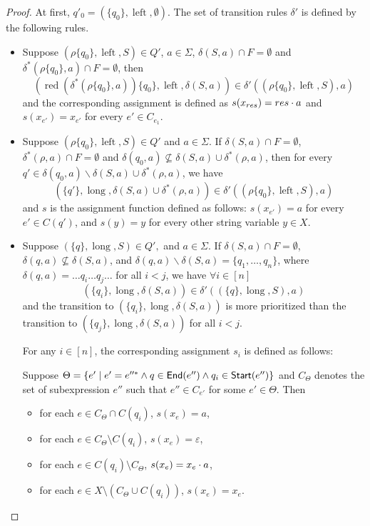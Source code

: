 \documentclass[sigplan,review,anonymous]{acmart}\settopmatter{printfolios=true,printccs=false,printacmref=false}
\newcommand{\tmop}[1]{\ensuremath{\operatorname{#1}}}
\newcommand\ssym{{\sf Start}}
\newcommand\esym{{\sf End}}
\begin{document}
\begin{proof}
At first, $q'_0= (\{ q_0
\}, \tmop{left}, \emptyset)$. The set of transition rules $\delta'$ is defined by the following rules.

\begin{itemize}
  
  \item Suppose $(\rho \{ q_0 \}, \tmop{left}, S) \in Q'$, $a \in \Sigma$,
  $\delta (S, a) \cap F = \emptyset$ and $\delta^{\ast} (\rho \{ q_0 \}, a) \cap F =
  \emptyset$, then
  \[ (\tmop{red} (\delta^{\ast} (\rho \{ q_0 \}, a)) \{ q_0 \}, \tmop{left}, \delta
     (S, a)) \in \delta' ((\rho \{ q_0 \}, \tmop{left}, S), a) \]
  and the corresponding assignment is defined as $s(x_{res}) = res \cdot a$ and $s(x_{e'})=x_{e'}$ for
  every $e' \in C_{e_1}$.
  
  \item Suppose $(\rho \{ q_0 \}, \tmop{left}, S) \in Q'$ and $a \in \Sigma$.
  If $\delta (S, a) \cap F = \emptyset$, $\delta^{\ast} (\rho, a) \cap F = \emptyset$
  and $\delta (q_0, a) \nsubseteq \delta (S, a) \cup \delta^{\ast} (\rho, a)$, then
  for every $q' \in \delta (q_0, a) \backslash \delta (S, a) \cup \delta^{\ast}
  (\rho, a)$, we have
  \[ (\{ q' \}, \tmop{long}, \delta (S, a) \cup \delta^{\ast} (\rho, a)) \in \delta'
     ((\rho \{ q_0 \}, \tmop{left}, S), a) \]
  and $s$ is the assignment function defined as follows: $s(x_{e'}) = a$ for every $e'  \in C(q')$, and $s(y)=y$ for every other string variable $y \in X$.
  
  \item Suppose $(\{ q \}, \tmop{long}, S) \in Q',$ and $a \in \Sigma$. If
  $\delta (S, a) \cap F = \emptyset$, $\delta (q, a) \nsubseteq \delta (S,
  a)$, and $\delta (q, a) \backslash \delta (S, a) = \{ q_1, \ldots,
  q_n \}$, where $\delta (q, a) = \ldots q_i \ldots q_j \ldots$ for all $i < j$,
  we have $\forall i \in [n]$
  \[ (\{ q_i \}, \tmop{long}, \delta (S, a)) \in \delta' ((\{ q \},
     \tmop{long}, S), a) \]
  and the transition to $(\{ q_i \}, \tmop{long}, \delta (S, a))$ is more prioritized than the transition to
  $(\{ q_j \}, \tmop{long}, \delta (S, a))$ for all $i < j$. 
  
  For any $i \in [n]$, the corresponding assignment $s_i$ is defined as follows:
  
  Suppose $\Theta = \{e' \mid e' = e''^*  \wedge
  q \in \esym(e'') \wedge q_i \in \ssym(e'') \}$ and $C_{\Theta}$ denotes the set of subexpression $e''$ such that $e'' \in C_{e'}$ for some $e' \in \Theta$.
Then 
\begin{itemize}
\item for each $e \in C_{\Theta} \cap C(q_i)$, $s(x_e) = a$,
%
\item for each $e \in C_{\Theta} \setminus C(q_i)$, $s(x_e) = \varepsilon$, 
%
\item for each $e \in C(q_i) \setminus C_\Theta$, $s(x_e) = x_e \cdot a$,
%
\item for each $e \in X \setminus (C_\Theta \cup C(q_i))$, $s(x_e)= x_e$.
\end{itemize}


\end{itemize}
\end{proof}
\end{document}
